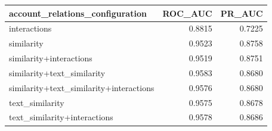 \begin{tabular}{lrr}
\toprule
account_relations_configuration & ROC_AUC & PR_AUC \\
\midrule
interactions & 0.8815 & 0.7225 \\
similarity & 0.9523 & 0.8758 \\
similarity+interactions & 0.9519 & 0.8751 \\
similarity+text_similarity & 0.9583 & 0.8680 \\
similarity+text_similarity+interactions & 0.9576 & 0.8680 \\
text_similarity & 0.9575 & 0.8678 \\
text_similarity+interactions & 0.9578 & 0.8686 \\
\bottomrule
\end{tabular}

